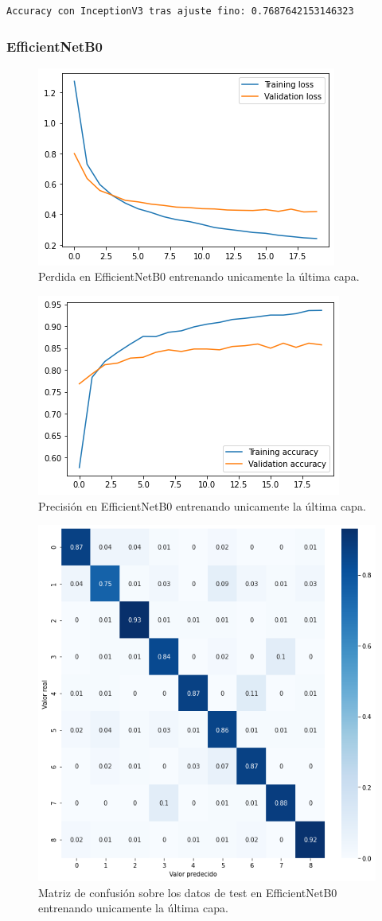 \begin{lstlisting}
Accuracy con InceptionV3 tras ajuste fino: 0.7687642153146323
\end{lstlisting}


\subsubsection{EfficientNetB0}

\begin{figure}[H]
  \centering
  \includegraphics[width=0.5\linewidth]{Imagenes/entrenamiento_redes/ult/efficientnet_ult_loss.png}
  \caption{Perdida en EfficientNetB0 entrenando unicamente la última capa.}
\end{figure}

\begin{figure}[H]
  \centering
  \includegraphics[width=0.5\linewidth]{Imagenes/entrenamiento_redes/ult/efficientnet_ult_acc.png}
  \caption{Precisión en EfficientNetB0 entrenando unicamente la última capa.}
\end{figure}

\begin{figure}[H]
  \centering
  \includegraphics[width=0.5\linewidth]{Imagenes/entrenamiento_redes/ult/efficientnet_ult_matriz.png}
  \caption{Matriz de confusión sobre los datos de test en EfficientNetB0 entrenando unicamente la última capa.}
\end{figure}


